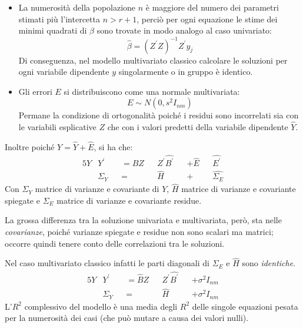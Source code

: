 \documentclass[a4page, 11pt]{article} %
\begin{document}
\begin{itemize}[noitemsep]
\item La numerosità della popolazione $n$ è maggiore del numero dei parametri stimati più l'intercetta $n > r + 1$, perciò per ogni equazione le stime dei minimi quadrati di $\hat{\beta}$ sono trovate in modo analogo al caso univariato:
\begin{equation*}
  \hat{\beta} = (Z^{\prime}Z)^{-1} Z^{\prime} y_j
\end{equation*}
Di conseguenza, nel modello multivariato classico calcolare le soluzioni per ogni variabile dipendente $y$ singolarmente o in gruppo è identico.
\item Gli errori $E$ si distribuiscono come una normale multivariata:
\begin{equation*}
E \sim N(0,s^2 I_{nm})
\end{equation*}
Permane la condizione di ortogonalità poiché i residui sono incorrelati sia con le variabili esplicative $Z$ che con i valori predetti della variabile dipendente $\hat{Y}$.
\end{itemize}

Inoltre poiché $Y = \hat{Y} + \hat{E}$, si ha che:
\begin{alignat*}{5}
  Y&Y^{\prime} &&= \hat{B}Z&&Z^{\prime}\hat{B^\prime} &&+  \hat{E}&&\hat{E^\prime} \\
  &\Sigma_Y &&= &&\hat{H} &&+ &&\hat{\Sigma_E}
\end{alignat*}
Con $\Sigma_Y$ matrice di varianze e covariante di $Y$, $\hat{H}$ matrice di varianze e covariante spiegate e $\Sigma_E$ matrice di varianze e covariante residue.

La grossa differenza tra la soluzione univariata e multivariata, però, sta nelle \textit{covarianze}, poiché varianze spiegate e residue non sono scalari ma matrici; occorre quindi tenere conto delle correlazioni tra le soluzioni.

Nel caso multivariato classico infatti le parti diagonali di $ \Sigma_E$ e $\hat{H}$ sono \textit{identiche}.
\begin{alignat*}{5}
  Y&Y^{\prime} &&= \hat{B}Z&&Z^{\prime}\hat{B^\prime} &&+ \sigma^2I_{nm} \\
  &\Sigma_Y &&= &&\hat{H} &&+ \sigma^2I_{nm}
\end{alignat*}
L’$R^2$ complessivo del modello è una media degli $R^2$ delle singole equazioni pesata per la numerosità dei casi (che può mutare a causa dei valori nulli).
\end{document}
